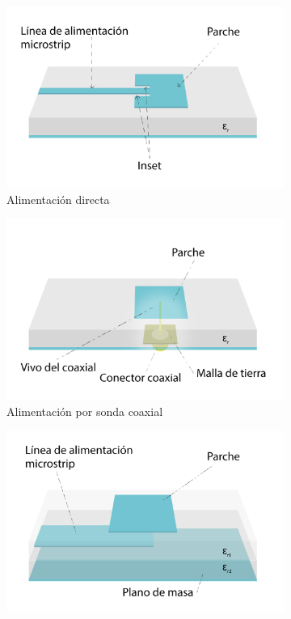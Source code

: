 \begin{figure}[h]
     \centering
     \begin{subfigure}[b]{0.45\textwidth}
         \centering
         \includegraphics[width=\textwidth]{archivos/parche/directa}
         \caption{Alimentación directa}
         \label{fig:directa}
     \end{subfigure}
     \hfill
     \begin{subfigure}[b]{0.45\textwidth}
         \centering
         \includegraphics[width=\textwidth]{archivos/parche/coax}
         \caption{Alimentación por sonda coaxial}
         \label{fig:coax}
     \end{subfigure}
     \hfill
     \begin{subfigure}[b]{0.45\textwidth}
         \centering
         \includegraphics[width=\textwidth]{archivos/parche/proximidad}

\end{subfigure}
\end{figure}
